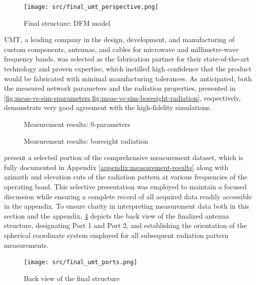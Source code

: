 \documentclass[11pt,a4paper,twoside,openany]{report}
\begin{document}
\begin{figure}[!ht]
    \centering
    \texttt{[image: src/final\_umt\_perspective.png]}
    \caption{\label{fig:final-umt-perspective}Final structure: DFM model}
\end{figure}
UMT, a leading company in the design, development, and manufacturing of custom components, antennas, and cables for microwave and millimetre-wave frequency bands, was selected as the fabrication partner for their state-of-the-art technology and proven expertise, which instilled high confidence that the product would be fabricated with minimal manufacturing tolerances. As anticipated, both the measured network parameters and the radiation properties, presented in \cref{fig:meas-vs-sim-sparameters,fig:meas-vs-sim-boresight-radiation}, respectively, demonstrate very good agreement with the high-fidelity simulations.

\begin{figure}[!ht]
    \centering
    
    \caption{\label{fig:meas-vs-sim-sparameters}Measurement results: S-parameters}
\end{figure}

\begin{figure}[!ht]
    \centering
    
    \caption{\label{fig:meas-vs-sim-boresight-radiation}Measurement results: boresight radiation}
\end{figure}

 present a selected portion of the comprehensive measurement dataset, which is fully documented in Appendix \ref{appendix:measurement-results} along with azimuth and elevation cuts of the radiation pattern at various frequencies of the operating band. This selective presentation was employed to maintain a focused discussion while ensuring a complete record of all acquired data readily accessible in the appendix. To ensure clarity in interpreting measurement data both in this section and the appendix, \cref{fig:final-ports} depicts the back view of the finalized antenna structure, designating Port 1 and Port 2, and establishing the orientation of the spherical coordinate system employed for all subsequent radiation pattern measurements.
\begin{figure}[!ht]
    \centering
    \texttt{[image: src/final\_umt\_ports.png]}
    \caption{\label{fig:final-ports}Back view of the final structure}
\end{figure}
\end{document}
